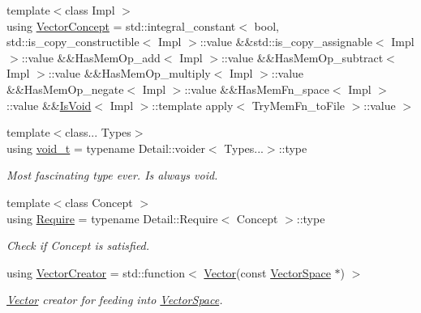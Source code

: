 \begin{DoxyCompactItemize}
\item 
{\footnotesize template$<$class Impl $>$ }\\using \hyperlink{group__ConceptGroup_gac8fbeed0f838941e90ebe635a546e1db}{Vector\+Concept} = std\+::integral\+\_\+constant$<$ bool, std\+::is\+\_\+copy\+\_\+constructible$<$ Impl $>$\+::value \&\&std\+::is\+\_\+copy\+\_\+assignable$<$ Impl $>$\+::value \&\&Has\+Mem\+Op\+\_\+add$<$ Impl $>$\+::value \&\&Has\+Mem\+Op\+\_\+subtract$<$ Impl $>$\+::value \&\&Has\+Mem\+Op\+\_\+multiply$<$ Impl $>$\+::value \&\&Has\+Mem\+Op\+\_\+negate$<$ Impl $>$\+::value \&\&Has\+Mem\+Fn\+\_\+space$<$ Impl $>$\+::value \&\&\hyperlink{structSpacy_1_1IsVoid}{Is\+Void}$<$ Impl $>$\+::template apply$<$ Try\+Mem\+Fn\+\_\+to\+File $>$\+::value $>$
\item 
\hypertarget{namespaceSpacy_a63ae343327f8e3bde02913c0be7d8655}{}{\footnotesize template$<$class... Types$>$ }\\using \hyperlink{namespaceSpacy_a63ae343327f8e3bde02913c0be7d8655}{void\+\_\+t} = typename Detail\+::voider$<$ Types...$>$\+::type\label{namespaceSpacy_a63ae343327f8e3bde02913c0be7d8655}

\begin{DoxyCompactList}\small\item\em Most fascinating type ever. Is always void. \end{DoxyCompactList}\item 
\hypertarget{namespaceSpacy_ac61567d9e23ef27cc6ecd52ab3512fb1}{}{\footnotesize template$<$class Concept $>$ }\\using \hyperlink{namespaceSpacy_ac61567d9e23ef27cc6ecd52ab3512fb1}{Require} = typename Detail\+::\+Require$<$ Concept $>$\+::type\label{namespaceSpacy_ac61567d9e23ef27cc6ecd52ab3512fb1}

\begin{DoxyCompactList}\small\item\em Check if Concept is satisfied. \end{DoxyCompactList}\item 
using \hyperlink{namespaceSpacy_a94fc7a4b9d3b26ef835e61647fac4d9b}{Vector\+Creator} = std\+::function$<$ \hyperlink{classSpacy_1_1Vector}{Vector}(const \hyperlink{classSpacy_1_1VectorSpace}{Vector\+Space} $\ast$) $>$
\begin{DoxyCompactList}\small\item\em \hyperlink{classSpacy_1_1Vector}{Vector} creator for feeding into \hyperlink{classSpacy_1_1VectorSpace}{Vector\+Space}. \end{DoxyCompactList}\end{DoxyCompactItemize}
